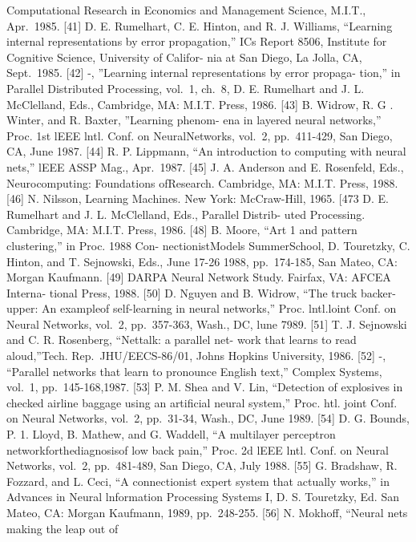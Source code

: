 Computational Research in Economics and Management Science, M.I.T.,
Apr.~1985. {[}41{]} D. E. Rumelhart, C. E. Hinton, and R. J. Williams,
``Learning internal representations by error propagation,'' ICs Report
8506, Institute for Cognitive Science, University of Califor- nia at San
Diego, La Jolla, CA, Sept.~1985. {[}42{]} -, ''Learning internal
representations by error propaga- tion,'' in Parallel Distributed
Processing, vol.~1, ch.~8, D. E. Rumelhart and J. L. McClelland, Eds.,
Cambridge, MA: M.I.T. Press, 1986. {[}43{]} B. Widrow, R. G . Winter,
and R. Baxter, ''Learning phenom- ena in layered neural networks,''
Proc. 1st lEEE lntl. Conf. on NeuralNetworks, vol.~2, pp.~411-429, San
Diego, CA, June 1987. {[}44{]} R. P. Lippmann, ``An introduction to
computing with neural nets,'' lEEE ASSP Mag., Apr.~1987. {[}45{]} J. A.
Anderson and E. Rosenfeld, Eds., Neurocomputing: Foundations ofResearch.
Cambridge, MA: M.I.T. Press, 1988. {[}46{]} N. Nilsson, Learning
Machines. New York: McCraw-Hill, 1965. {[}473 D. E. Rumelhart and J. L.
McClelland, Eds., Parallel Distrib- uted Processing. Cambridge, MA:
M.I.T. Press, 1986. {[}48{]} B. Moore, ``Art 1 and pattern clustering,''
in Proc. 1988 Con- nectionistModels SummerSchool, D. Touretzky, C.
Hinton, and T. Sejnowski, Eds., June 17-26 1988, pp.~174-185, San Mateo,
CA: Morgan Kaufmann. {[}49{]} DARPA Neural Network Study. Fairfax, VA:
AFCEA Interna- tional Press, 1988. {[}50{]} D. Nguyen and B. Widrow,
``The truck backer-upper: An exampleof self-learning in neural
networks,'' Proc. lntl.loint Conf. on Neural Networks, vol.~2,
pp.~357-363, Wash., DC, lune 7989. {[}51{]} T. J. Sejnowski and C. R.
Rosenberg, ``Nettalk: a parallel net- work that learns to read
aloud,''Tech. Rep.~JHU/EECS-86/01, Johns Hopkins University, 1986.
{[}52{]} -, ``Parallel networks that learn to pronounce English text,''
Complex Systems, vol.~1, pp.~145-168,1987. {[}53{]} P. M. Shea and V.
Lin, ``Detection of explosives in checked airline baggage using an
artificial neural system,'' Proc. htl. joint Conf. on Neural Networks,
vol.~2, pp.~31-34, Wash., DC, June 1989. {[}54{]} D. G. Bounds, P. 1.
Lloyd, B. Mathew, and G. Waddell, ``A multilayer perceptron
networkforthediagnosisof low back pain,'' Proc. 2d lEEE lntl. Conf. on
Neural Networks, vol.~2, pp.~481-489, San Diego, CA, July 1988. {[}55{]}
G. Bradshaw, R. Fozzard, and L. Ceci, ``A connectionist expert system
that actually works,'' in Advances in Neural lnformation Processing
Systems I, D. S. Touretzky, Ed. San Mateo, CA: Morgan Kaufmann, 1989,
pp.~248-255. {[}56{]} N. Mokhoff, ``Neural nets making the leap out of
